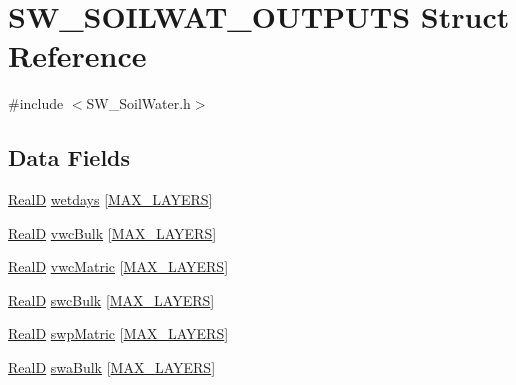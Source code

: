 \hypertarget{struct_s_w___s_o_i_l_w_a_t___o_u_t_p_u_t_s}{}\section{S\+W\+\_\+\+S\+O\+I\+L\+W\+A\+T\+\_\+\+O\+U\+T\+P\+U\+TS Struct Reference}
\label{struct_s_w___s_o_i_l_w_a_t___o_u_t_p_u_t_s}


{\ttfamily \#include $<$S\+W\+\_\+\+Soil\+Water.\+h$>$}

\subsection*{Data Fields}
\begin{DoxyCompactItemize}
\item 
\hyperlink{generic_8h_af1c105fd5732f70b91ddaeda0cc340e3}{RealD} \hyperlink{struct_s_w___s_o_i_l_w_a_t___o_u_t_p_u_t_s_aed2dfb051dba45c3686b8ec7e507ae7c}{wetdays} \mbox{[}\hyperlink{_s_w___defines_8h_ade9d4b2ac5f29fe89ffea40e7c58c9d6}{M\+A\+X\+\_\+\+L\+A\+Y\+E\+RS}\mbox{]}
\item 
\hyperlink{generic_8h_af1c105fd5732f70b91ddaeda0cc340e3}{RealD} \hyperlink{struct_s_w___s_o_i_l_w_a_t___o_u_t_p_u_t_s_a994933243a4cc2d79f473370c2a76053}{vwc\+Bulk} \mbox{[}\hyperlink{_s_w___defines_8h_ade9d4b2ac5f29fe89ffea40e7c58c9d6}{M\+A\+X\+\_\+\+L\+A\+Y\+E\+RS}\mbox{]}
\item 
\hyperlink{generic_8h_af1c105fd5732f70b91ddaeda0cc340e3}{RealD} \hyperlink{struct_s_w___s_o_i_l_w_a_t___o_u_t_p_u_t_s_a78733c0563f5cdc6c7086e0459ce64b1}{vwc\+Matric} \mbox{[}\hyperlink{_s_w___defines_8h_ade9d4b2ac5f29fe89ffea40e7c58c9d6}{M\+A\+X\+\_\+\+L\+A\+Y\+E\+RS}\mbox{]}
\item 
\hyperlink{generic_8h_af1c105fd5732f70b91ddaeda0cc340e3}{RealD} \hyperlink{struct_s_w___s_o_i_l_w_a_t___o_u_t_p_u_t_s_aa01a03fb2985bfb56d3fe74c62d0b93c}{swc\+Bulk} \mbox{[}\hyperlink{_s_w___defines_8h_ade9d4b2ac5f29fe89ffea40e7c58c9d6}{M\+A\+X\+\_\+\+L\+A\+Y\+E\+RS}\mbox{]}
\item 
\hyperlink{generic_8h_af1c105fd5732f70b91ddaeda0cc340e3}{RealD} \hyperlink{struct_s_w___s_o_i_l_w_a_t___o_u_t_p_u_t_s_a2732c7d89253515ee553d84302d6c1ea}{swp\+Matric} \mbox{[}\hyperlink{_s_w___defines_8h_ade9d4b2ac5f29fe89ffea40e7c58c9d6}{M\+A\+X\+\_\+\+L\+A\+Y\+E\+RS}\mbox{]}
\item 
\hyperlink{generic_8h_af1c105fd5732f70b91ddaeda0cc340e3}{RealD} \hyperlink{struct_s_w___s_o_i_l_w_a_t___o_u_t_p_u_t_s_a6025267482ec8ad65feb6ea92a6433f1}{swa\+Bulk} \mbox{[}\hyperlink{_s_w___defines_8h_ade9d4b2ac5f29fe89ffea40e7c58c9d6}{M\+A\+X\+\_\+\+L\+A\+Y\+E\+RS}\mbox{]}

\end{DoxyCompactItemize}

